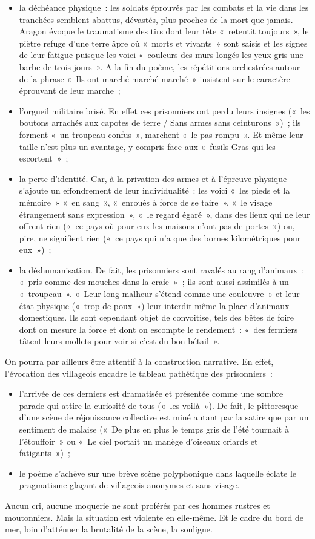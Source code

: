 {\begin{itemize}
\item la déchéance physique~: les soldats éprouvés par les combats et la vie dans les
tranchées semblent abattus, dévastés, plus proches de la mort que jamais. Aragon
évoque le traumatisme des tirs dont leur tête «~retentit toujours~», le piètre refuge d'une
terre âpre où «~morts et vivants~» sont saisis et les signes de leur fatigue puisque les
voici «~couleurs des murs longés les yeux gris une barbe de trois jours~». A la fin du
poème, les répétitions orchestrées autour de la phrase «~Ils ont marché marché
marché~» insistent sur le caractère éprouvant de leur marche~;
\item l'orgueil militaire brisé. En effet ces prisonniers ont perdu leurs insignes («~les boutons
arrachés aux capotes de terre / Sans armes sans ceinturons~»)~; ils forment «~un
troupeau confus~», marchent «~le pas rompu~». Et même leur taille n'est plus un
avantage, y compris face aux «~fusils Gras qui les escortent~»~;
\item la perte d'identité. Car, à la privation des armes et à l'épreuve physique s'ajoute un
effondrement de leur individualité~: les voici «~les pieds et la mémoire~» «~en sang~»,
«~enroués à force de se taire~», «~le visage étrangement sans expression~», «~le regard
égaré~», dans des lieux qui ne leur offrent rien («~ce pays où pour eux les maisons
n'ont pas de portes~») ou, pire, ne signifient rien («~ce pays qui n'a que des bornes
kilométriques pour eux~»)~;
\item la déshumanisation. De fait, les prisonniers sont ravalés au rang d'animaux~: «~pris
comme des mouches dans la craie~»~; ils sont aussi assimilés à un «~troupeau~».
«~Leur long malheur s'étend comme une couleuvre~» et leur état physique («~trop de
poux~») leur interdit même la place d'animaux domestiques. Ils sont cependant objet
de convoitise, tels des bêtes de foire dont on mesure la force et dont on escompte le
rendement~: «~des fermiers tâtent leurs mollets pour voir si c'est du bon bétail~».
\end{itemize}

On pourra par ailleurs être attentif à la construction narrative. En effet, l'évocation
des villageois encadre le tableau pathétique des prisonniers~:

\begin{itemize}
\item l'arrivée de ces derniers est dramatisée et présentée comme une sombre
parade qui attire la curiosité de tous («~les voilà~»). De fait, le pittoresque d'une scène
de réjouissance collective est miné autant par la satire que par un sentiment de
malaise («~De plus en plus le temps gris de l'été tournait à l'étouffoir~» ou «~Le ciel
portait un manège d'oiseaux criards et fatigants~»)~;
\item le poème s'achève sur une brève scène polyphonique dans laquelle éclate le
pragmatisme glaçant de villageois anonymes et sans visage.
\end{itemize}
Aucun cri, aucune moquerie ne sont proférés par ces hommes rustres et
moutonniers. Mais la situation est violente en elle-même. Et le cadre du bord de mer,
loin d'atténuer la brutalité de la scène, la souligne.

}
